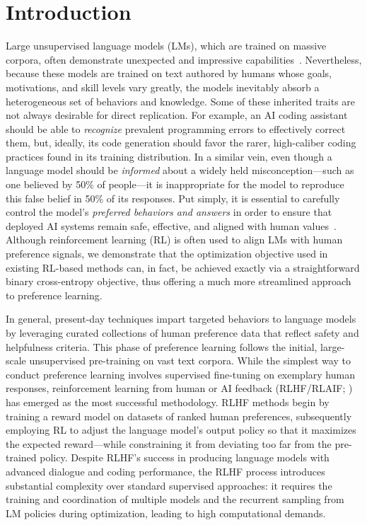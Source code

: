 \section{Introduction}
Large unsupervised language models (LMs), which are trained on massive corpora, often demonstrate unexpected and impressive capabilities~\citep{chowdhery2022palm, brown2020language, touvron2023llama,bubeck2023sparks}. Nevertheless, because these models are trained on text authored by humans whose goals, motivations, and skill levels vary greatly, the models inevitably absorb a heterogeneous set of behaviors and knowledge. Some of these inherited traits are not always desirable for direct replication. For example, an AI coding assistant should be able to \textit{recognize} prevalent programming errors to effectively correct them, but, ideally, its code generation should favor the rarer, high-caliber coding practices found in its training distribution. In a similar vein, even though a language model should be \textit{informed} about a widely held misconception—such as one believed by 50\% of people—it is inappropriate for the model to reproduce this false belief in 50\% of its responses. Put simply, it is essential to carefully control the model’s \emph{preferred behaviors and answers} in order to ensure that deployed AI systems remain safe, effective, and aligned with human values~\citep{ouyang2022training}. Although reinforcement learning (RL) is often used to align LMs with human preference signals, we demonstrate that the optimization objective used in existing RL-based methods can, in fact, be achieved exactly via a straightforward binary cross-entropy objective, thus offering a much more streamlined approach to preference learning.

In general, present-day techniques impart targeted behaviors to language models by leveraging curated collections of human preference data that reflect safety and helpfulness criteria. This phase of preference learning follows the initial, large-scale unsupervised pre-training on vast text corpora. While the simplest way to conduct preference learning involves supervised fine-tuning on exemplary human responses, reinforcement learning from human or AI feedback (RLHF/RLAIF; \citep{christiano2017deep,bai2022constitutional}) has emerged as the most successful methodology. RLHF methods begin by training a reward model on datasets of ranked human preferences, subsequently employing RL to adjust the language model’s output policy so that it maximizes the expected reward—while constraining it from deviating too far from the pre-trained policy. Despite RLHF’s success in producing language models with advanced dialogue and coding performance, the RLHF process introduces substantial complexity over standard supervised approaches: it requires the training and coordination of multiple models and the recurrent sampling from LM policies during optimization, leading to high computational demands.

